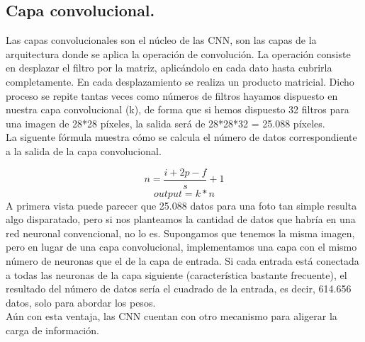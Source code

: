 \documentclass[a4paper,10pt]{article}
\begin{document}
\subsection{Capa convolucional.}
Las capas convolucionales son el núcleo de las CNN, son las capas de la arquitectura donde se aplica la operación de convolución. La operación consiste en desplazar el filtro por la matriz, aplicándolo en cada dato hasta cubrirla completamente. En cada desplazamiento se realiza un producto matricial. Dicho proceso se repite tantas veces como números de filtros hayamos dispuesto en nuestra capa convolucional (k), de forma que si hemos dispuesto 32 filtros para una imagen de 28*28 píxeles, la salida será de 28*28*32 = 25.088 píxeles.
 \\La siguente fórmula muestra cómo se calcula el número de datos correspondiente a la salida de la capa convolucional.

\[
n=\frac{i+2p-f}{s}  +1
\]
\[
output = k * n
\]
A primera vista puede parecer que 25.088 datos para una foto tan simple resulta algo disparatado, pero si nos planteamos la cantidad de datos que habría en una red neuronal convencional, no lo es. Supongamos que tenemos la misma imagen, pero en lugar de una capa convolucional, implementamos una capa con el mismo número de neuronas que el de la capa de entrada. Si cada entrada está conectada a todas las neuronas de la capa siguiente (característica bastante frecuente), el resultado del número de datos sería el cuadrado de la entrada, es decir, 614.656 datos, solo para abordar los pesos. \\
Aún con esta ventaja, las CNN cuentan con otro mecanismo para aligerar la carga de información.
\end{document}
